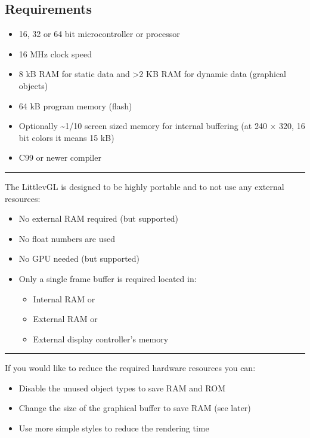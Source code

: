 \documentclass[letterpaper,10pt,english]{sphinxmanual}
\begin{document}
\subsection{Requirements}
\label{\detokenize{intro:requirements}}\begin{itemize}
\item {} 
16, 32 or 64 bit microcontroller or processor

\item {} 
16 MHz clock speed

\item {} 
8 kB RAM for static data and \textgreater{}2 KB RAM for dynamic data (graphical objects)

\item {} 
64 kB program memory (flash)

\item {} 
Optionally \textasciitilde{}1/10 screen sized memory for internal buffering (at 240 × 320, 16 bit colors it means 15 kB)

\item {} 
C99 or newer compiler

\end{itemize}


\bigskip\hrule\bigskip


The LittlevGL is designed to be highly portable and to not use any external resources:
\begin{itemize}
\item {} 
No external RAM required (but supported)

\item {} 
No float numbers are used

\item {} 
No GPU needed (but supported)

\item {} 
Only a single frame buffer is required located in:
\begin{itemize}
\item {} 
Internal RAM or

\item {} 
External RAM or

\item {} 
External display controller’s memory

\end{itemize}

\end{itemize}


\bigskip\hrule\bigskip


If you would like to reduce the required hardware resources you can:
\begin{itemize}
\item {} 
Disable the unused object types to save RAM and ROM

\item {} 
Change the size of the graphical buffer to save RAM (see later)

\item {} 
Use more simple styles to reduce the rendering time

\end{itemize}
\end{document}
